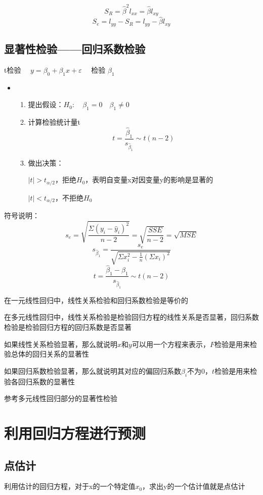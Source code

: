 \documentclass[UTF8,10pt]{book}
\begin{document}
$$ S_R = \hat{\beta}^2 l_{xx}=\hat{\beta}l_{xy} $$ 
$$ S_e = l_{yy} - S_R = l_{yy}-\hat{\beta}l_{xy} $$

\subsection{显著性检验——回归系数检验}	
t检验 
$\quad y = \beta_0 + \beta_1 x+ \varepsilon \quad$
检验 $\beta_1$

\begin{itemize}
	\item [] {
		\begin{enumerate}
			\item 提出假设：$H_0: \quad \beta_1 = 0 \quad \beta_1 \neq 0$
			\item 计算检验统计量t $$t = \frac{\hat{\beta}_1}{s_{\hat{\beta}_1}} \sim t(n-2) $$		
			\item 做出决策：
			
			$|t|>t_{\alpha/2}$，拒绝$H_0$，表明自变量x对因变量y的影响是显著的
			
			$|t|<t_{\alpha/2}$，不拒绝$H_0$ 
			
		\end{enumerate}
	}
\end{itemize}

符号说明： 
$$ s_e = \sqrt{\frac{\Sigma (y_i - \hat{y}_i)^2}{n-2}} = \sqrt{\frac{SSE}{n-2}}=\sqrt{MSE} $$ 
$$s_{\hat{\beta}_1} = \frac{s_e}{\sqrt{\Sigma x_i^2 - \frac{1}{n}(\Sigma x_i)^2}} $$ 
$$t = \frac{\hat{\beta}_1 - \beta_1}{s_{\hat{\beta}_1}} \sim t(n-2)$$

{\kaishu 
在一元线性回归中，线性关系检验和回归系数检验是等价的

在多元线性回归中，线性关系检验是检验回归方程的线性关系是否显著，回归系数检验是检验回归方程的回归系数是否显著

如果线性关系检验显著，那么就说明$x$和$y$可以用一个方程来表示，$F$检验是用来检验总体的回归关系的显著性

如果回归系数检验显著，那么就说明其对应的偏回归系数$\beta_i$不为$0$，$t$检验是用来检验各回归系数的显著性
}

参考多元线性回归部分的显著性检验


\section{利用回归方程进行预测}

\subsection{点估计}	
利用估计的回归方程，对于x的一个特定值$x_0$，求出y的一个估计值就是点估计 
\end{document}
